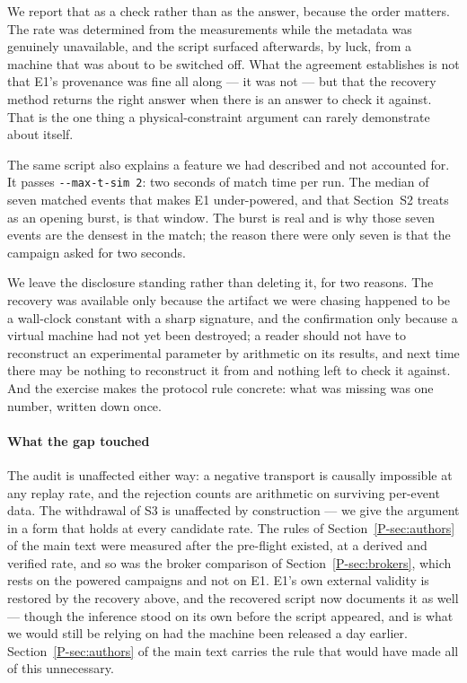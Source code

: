 \documentclass[10pt,journal,onecolumn]{IEEEtran}
\newcommand{\mainBrokers}{\ref{P-sec:brokers}}        %
\newcommand{\mainAuthors}{\ref{P-sec:authors}}        %
\begin{document}
We report that as a check rather than as the answer, because the order matters. The rate was
determined from the measurements while the metadata was genuinely unavailable, and the script
surfaced afterwards, by luck, from a machine that was about to be switched off. What the
agreement establishes is not that E1's provenance was fine all along --- it was not --- but that
the recovery method returns the right answer when there is an answer to check it against. That is
the one thing a physical-constraint argument can rarely demonstrate about itself.

The same script also explains a feature we had described and not accounted for. It passes
\texttt{-{}-max-t-sim 2}: two seconds of match time per run. The median of seven matched events
that makes E1 under-powered, and that Section~S2 treats as an opening burst,
is that window. The burst is real and is why those seven events are the densest in the match; the
reason there were only seven is that the campaign asked for two seconds.

We leave the disclosure standing rather than deleting it, for two reasons. The recovery was
available only because the artifact we were chasing happened to be a wall-clock constant with a
sharp signature, and the confirmation only because a virtual machine had not yet been destroyed;
a reader should not have to reconstruct an experimental parameter by arithmetic on its results,
and next time there may be nothing to reconstruct it from and nothing left to check it against.
And the exercise makes the protocol rule concrete: what was missing was one number, written down
once.

\paragraph{What the gap touched} The audit is unaffected either way: a negative transport is
causally impossible at any replay rate, and the rejection counts are arithmetic on surviving
per-event data. The withdrawal of S3 is unaffected by construction --- we give the argument in a
form that holds at every candidate rate. The rules of Section~\mainAuthors{} of the main text
were measured after the pre-flight existed, at a derived and verified rate, and so was the
broker comparison of Section~\mainBrokers{}, which rests on the powered campaigns and not on E1.
E1's own external validity is restored by the recovery above, and the
recovered script now documents it as well --- though the inference stood on its own before the
script appeared, and is what we would still be relying on had the machine been released a day
earlier.
Section~\mainAuthors{} of the main text carries the rule that would have made all of this unnecessary.
\end{document}
